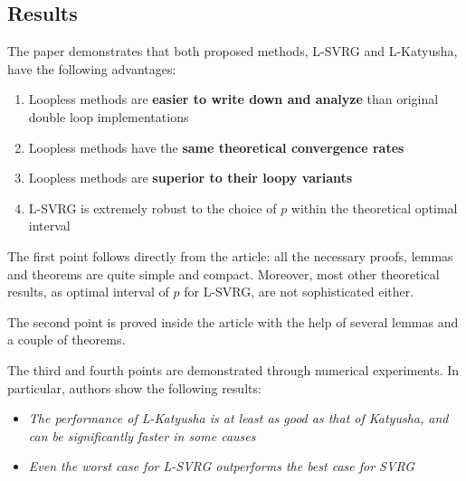 \documentclass{article}
\begin{document}
\subsection{Results}
The paper demonstrates that both proposed methods,
L-SVRG and L-Katyusha, have the following advantages:
\begin{enumerate}
  \item Loopless methods are  \textbf{easier to write down and analyze}
  than original double loop implementations
  \item Loopless methods have the \textbf{same theoretical convergence rates}
  \item Loopless methods are  \textbf{superior to their loopy variants}
  \item L-SVRG is extremely robust to the choice of \(p\) within the
  theoretical optimal interval
\end{enumerate}

The first point follows directly from the article: all the necessary proofs,
lemmas and theorems are quite simple and compact. Moreover, most other
theoretical results, as optimal interval of \(p\) for L-SVRG, are not
sophisticated either.

The second point is proved inside the article with the help of several lemmas and
a couple of theorems.

The third and fourth points are demonstrated through numerical experiments.
In particular, authors show the following results:
\begin{itemize}
  \item \textit{The performance of L-Katyusha is at least as good as
  that of Katyusha, and can be significantly faster in some causes}
  \item \textit{Even the worst case for L-SVRG outperforms the best case for SVRG}
\end{itemize}
\end{document}
